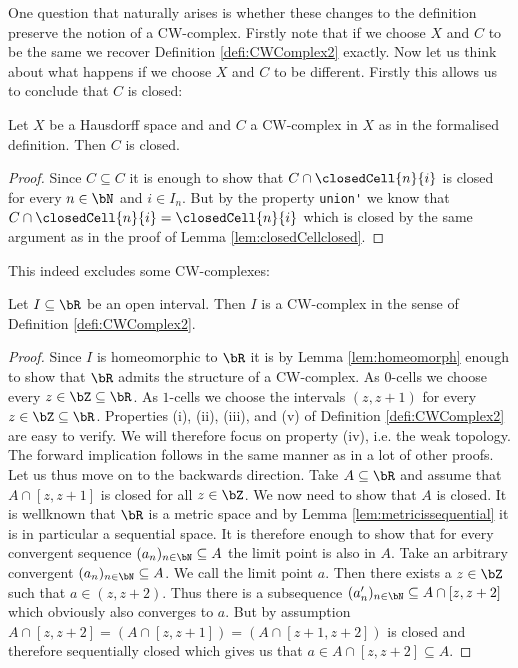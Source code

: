 One question that naturally arises is whether these changes to the definition preserve the notion of a CW-complex. 
Firstly note that if we choose $X$ and $C$ to be the same we recover Definition \ref{defi:CWComplex2} exactly. 
Now let us think about what happens if we choose $X$ and $C$ to be different. 
Firstly this allows us to conclude that $C$ is closed: 

\begin{lem} \label{lem:Cclosed}
  Let $X$ be a Hausdorff space and and $C$ a CW-complex in $X$ as in the formalised definition. 
  Then $C$ is closed.
\end{lem}
\begin{proof}
  Since $C \subseteq C$ it is enough to show that $C \cap \closedCell{n}{i}$ is closed for every $n \in \bN$ and $i \in I_n$. 
  But by the property \lstinline{union'} we know that $C \cap \closedCell{n}{i} = \closedCell{n}{i}$ which is closed by the same argument as in the proof of Lemma \ref{lem:closedCellclosed}.
\end{proof}

This indeed excludes some CW-complexes: 

\begin{example}
  Let $I \subseteq \bR$ be an open interval. 
  Then $I$ is a CW-complex in the sense of Definition \ref{defi:CWComplex2}.
\end{example}
\begin{proof}
  Since $I$ is homeomorphic to $\bR$ it is by Lemma \ref{lem:homeomorph} enough to show that $\bR$ admits the structure of a CW-complex. 
  As $0$-cells we choose every $z \in \bZ \subseteq \bR$. 
  As $1$-cells we choose the intervals $(z, z + 1)$ for every $z \in \bZ \subseteq \bR$.  
  Properties (i), (ii), (iii), and (v) of Definition \ref{defi:CWComplex2} are easy to verify. 
  We will therefore focus on property (iv), i.e. the weak topology. 
  The forward implication follows in the same manner as in a lot of other proofs. 
  Let us thus move on to the backwards direction. 
  Take $A \subseteq \bR$ and assume that $A \cap [z, z + 1]$ is closed for all $z \in \bZ$. 
  We now need to show that $A$ is closed.
  It is wellknown that $\bR$ is a metric space and by Lemma \ref{lem:metricissequential} it is in particular a sequential space. 
  It is therefore enough to show that for every convergent sequence $(a_n)_{n \in \bN} \subseteq A$ the limit point is also in $A$. 
  Take an arbitrary convergent $(a_n)_{n \in \bN} \subseteq A$. 
  We call the limit point $a$.
  Then there exists a $z \in \bZ$ such that $a \in (z, z + 2)$. 
  Thus there is a subsequence $(a'_n)_{n \in \bN} \subseteq A \cap [z, z + 2]$ which obviously also converges to $a$. 
  But by assumption $A \cap [z, z + 2] = (A \cap [z, z + 1]) = (A \cap [z + 1, z + 2])$ is closed and therefore sequentially closed which gives us that $a \in A \cap [z, z + 2] \subseteq A$.
\end{proof}

